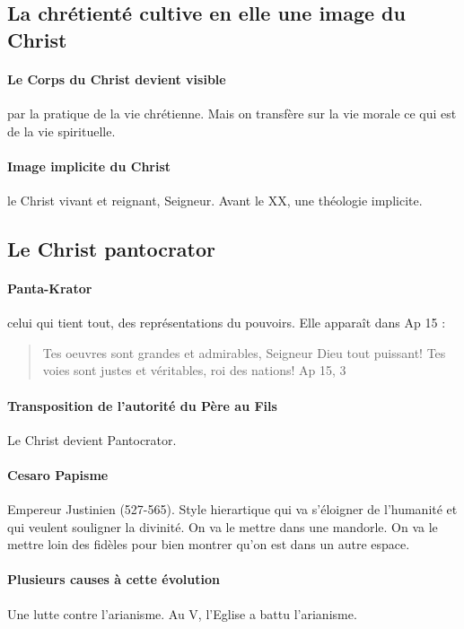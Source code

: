 


\subsection{ La chrétienté cultive en elle une image du Christ}
\paragraph{
Le Corps du Christ devient visible } par la pratique de la vie chrétienne. Mais on transfère sur la vie morale ce qui est de la vie spirituelle. 

\paragraph{Image implicite du Christ} le Christ vivant et reignant, Seigneur. Avant le XX, une théologie implicite.




\subsection{Le Christ pantocrator}

\paragraph{Panta-Krator} celui qui tient tout, des représentations du pouvoirs. Elle apparaît dans Ap 15 : 
\begin{quote}
     Tes oeuvres sont grandes et admirables, Seigneur Dieu tout puissant! Tes voies sont justes et véritables, roi des nations!
     Ap 15, 3
\end{quote}

\paragraph{Transposition de l'autorité du Père au Fils} Le Christ devient Pantocrator. 

\paragraph{Cesaro Papisme }Empereur Justinien (527-565). Style hierartique qui va s'éloigner de l'humanité et qui veulent souligner la divinité.  On va le mettre dans une mandorle. On va le mettre loin des fidèles pour bien montrer qu'on est dans un autre espace.

\paragraph{Plusieurs causes à cette évolution} Une lutte contre l'arianisme.  Au V, l'Eglise a battu l'arianisme.






